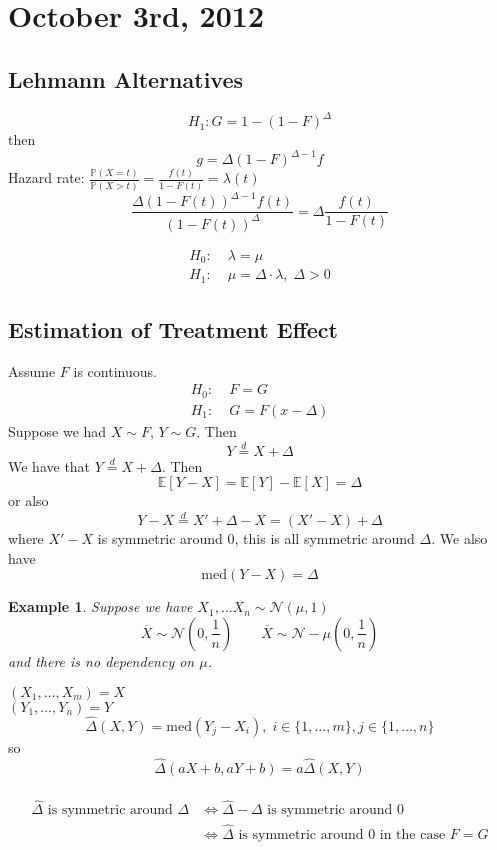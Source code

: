 \documentclass[a4paper,12pt]{amsart}
\newcommand{\E}[1]{\mathbb{E}\left[#1\right]}
\newcommand{\p}[1]{\mathbb{P}\left(#1\right)}
\newtheorem{ex}{Example}
\begin{document}
\section{October 3rd, 2012}
\subsection{Lehmann Alternatives}
\[H_1: G = 1 - (1-F)^\Delta\]
then
\[g = \Delta(1-F)^{\Delta-1}f\]
Hazard rate: $\displaystyle \frac{\p{X=t}}{\p{X>t}} = \frac{f(t)}{1-F(t)} = \lambda(t)$
\[\frac{\Delta (1-F(t))^{\Delta-1}f(t)}{(1-F(t))^\Delta} = \Delta \frac{f(t)}{1-F(t)}\]

\begin{align*}
H_0: &\; \lambda = \mu\\
H_1: &\; \mu = \Delta \cdot \lambda, \; \Delta >0
\end{align*}

\subsection{Estimation of Treatment Effect}
Assume $F$ is continuous.
\begin{align*}
H_0: &\; F = G\\
H_1: &\; G = F(x- \Delta)
\end{align*}
Suppose we had $X \sim F$, $Y \sim G$. Then
\[Y \overset{d}{=} X + \Delta\]
We have that $Y \overset{d}{=}X + \Delta$. Then
\[\E{Y-X} = \E{Y} - \E{X} = \Delta\]
or also
\[Y-X \overset{d}{=} X' + \Delta - X = (X' - X) + \Delta\]
where $X'-X$ is symmetric around 0, this is all symmetric around $\Delta$. We also have
\[\text{med}(Y-X) = \Delta\]

\begin{ex}
Suppose we have $X_1, \ldots X_n \sim \mathcal{N}(\mu,1)$
\[\overline{X} \sim \mathcal{N}\left(0,\frac{1}{n}\right) \qquad \overline{X} \sim \mathcal{N}-\mu \left(0,\frac{1}{n}\right)\]
and there is no dependency on $\mu$.
\end{ex}

\noindent
$(X_1,\ldots,X_m) = X$\\
$(Y_1,\ldots,Y_n) = Y$\\
\[\widehat{\Delta}(X,Y) = \text{med}(Y_j - X_i) , \; i \in \{1,\ldots, m\}, j \in \{1, \ldots, n\}\]
so 
\[\widehat{\Delta}(aX +b,aY+b) = a \widehat{\Delta}(X,Y)\]
\\
\begin{align*}
\widehat{\Delta} \text{ is symmetric around } \Delta &\Leftrightarrow \widehat{\Delta} - \Delta \text{ is symmetric around } 0\\
&\Leftrightarrow \widehat{\Delta} \text{ is symmetric around 0 in the case } F=G
\end{align*}
\end{document}
